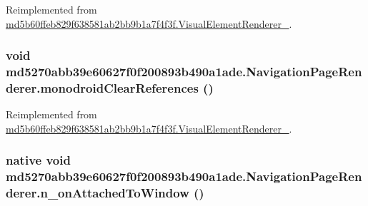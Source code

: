 Reimplemented from \hyperlink{classmd5b60ffeb829f638581ab2bb9b1a7f4f3f_1_1_visual_element_renderer__1_321b2967faff34b0f7971f55915f583e}{md5b60ffeb829f638581ab2bb9b1a7f4f3f.VisualElementRenderer\_}.\hypertarget{classmd5270abb39e60627f0f200893b490a1ade_1_1_navigation_page_renderer_61d42127ac3ca068adc349d6a33af47a}{
\subsubsection[{monodroidClearReferences}]{\setlength{\rightskip}{0pt plus 5cm}void md5270abb39e60627f0f200893b490a1ade.NavigationPageRenderer.monodroidClearReferences ()}}
\label{classmd5270abb39e60627f0f200893b490a1ade_1_1_navigation_page_renderer_61d42127ac3ca068adc349d6a33af47a}




Reimplemented from \hyperlink{classmd5b60ffeb829f638581ab2bb9b1a7f4f3f_1_1_visual_element_renderer__1_4a1c180026d8eab71549e47b7de4b9b8}{md5b60ffeb829f638581ab2bb9b1a7f4f3f.VisualElementRenderer\_}.\hypertarget{classmd5270abb39e60627f0f200893b490a1ade_1_1_navigation_page_renderer_afa96226c385d53d071a1041caa0083b}{
\subsubsection[{n\_\-onAttachedToWindow}]{\setlength{\rightskip}{0pt plus 5cm}native void md5270abb39e60627f0f200893b490a1ade.NavigationPageRenderer.n\_\-onAttachedToWindow ()}}
\label{classmd5270abb39e60627f0f200893b490a1ade_1_1_navigation_page_renderer_afa96226c385d53d071a1041caa0083b}


